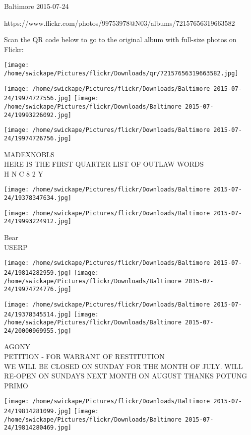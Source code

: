 \documentclass[10pt,letterpaper]{article}
\begin{document}
Baltimore 2015-07-24

https://www.flickr.com/photos/99753978@N03/albums/72157656319663582

Scan the QR code below to go to the original album with full-size photos on Flickr:

\texttt{[image: /home/swickape/Pictures/flickr/Downloads/qr/72157656319663582.jpg]}
\pagebreak

\texttt{[image: /home/swickape/Pictures/flickr/Downloads/Baltimore 2015-07-24/19974727556.jpg]}
\texttt{[image: /home/swickape/Pictures/flickr/Downloads/Baltimore 2015-07-24/19993226092.jpg]}

\texttt{[image: /home/swickape/Pictures/flickr/Downloads/Baltimore 2015-07-24/19974726756.jpg]}

MADEXNOBLS\\
HERE IS THE FIRST QUARTER LIST OF OUTLAW WORDS\\
H N C 8 2 Y\\
\pagebreak

\texttt{[image: /home/swickape/Pictures/flickr/Downloads/Baltimore 2015-07-24/19378347634.jpg]}

\vspace{0.25in}
\texttt{[image: /home/swickape/Pictures/flickr/Downloads/Baltimore 2015-07-24/19993224912.jpg]}

Bear\\
USERP\\
\pagebreak

\texttt{[image: /home/swickape/Pictures/flickr/Downloads/Baltimore 2015-07-24/19814282959.jpg]}
\texttt{[image: /home/swickape/Pictures/flickr/Downloads/Baltimore 2015-07-24/19974724776.jpg]}

\texttt{[image: /home/swickape/Pictures/flickr/Downloads/Baltimore 2015-07-24/19378345514.jpg]}
\texttt{[image: /home/swickape/Pictures/flickr/Downloads/Baltimore 2015-07-24/20000969955.jpg]}

AGONY\\
PETITION {-} FOR WARRANT OF RESTITUTION\\
WE WILL BE CLOSED ON SUNDAY FOR THE MONTH OF JULY.  WILL RE{-}OPEN ON SUNDAYS NEXT MONTH ON AUGUST THANKS POTUNG\\
PRIMO\\
\pagebreak

\texttt{[image: /home/swickape/Pictures/flickr/Downloads/Baltimore 2015-07-24/19814281099.jpg]}
\texttt{[image: /home/swickape/Pictures/flickr/Downloads/Baltimore 2015-07-24/19814280469.jpg]}
\end{document}
